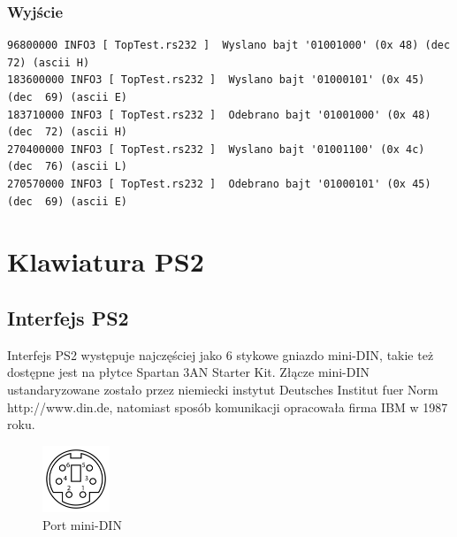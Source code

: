 \documentclass[a4paper,12pt]{article}
\begin{document}
\subsubsection{Wyjście}

\begin{verbatim}
96800000 INFO3 [ TopTest.rs232 ]  Wyslano bajt '01001000' (0x 48) (dec  72) (ascii H)
183600000 INFO3 [ TopTest.rs232 ]  Wyslano bajt '01000101' (0x 45) (dec  69) (ascii E)
183710000 INFO3 [ TopTest.rs232 ]  Odebrano bajt '01001000' (0x 48) (dec  72) (ascii H)
270400000 INFO3 [ TopTest.rs232 ]  Wyslano bajt '01001100' (0x 4c) (dec  76) (ascii L)
270570000 INFO3 [ TopTest.rs232 ]  Odebrano bajt '01000101' (0x 45) (dec  69) (ascii E)
\end{verbatim}




\newpage
\section{Klawiatura PS2}

\subsection{Interfejs PS2}

Interfejs PS2 występuje najczęściej jako 6 stykowe gniazdo mini-DIN, takie też dostępne jest na płytce Spartan 3AN Starter Kit. Złącze mini-DIN ustandaryzowane zostało przez niemiecki instytut Deutsches Institut fuer Norm http://www.din.de, natomiast sposób komunikacji opracowała firma IBM w 1987 roku.

\begin{figure}[htb]
   \centering
   \includegraphics[width=2cm]{grafika/150px-MiniDIN-6_Connector_Pinout.png}
   \caption{Port mini-DIN}
\end{figure}
\end{document}
